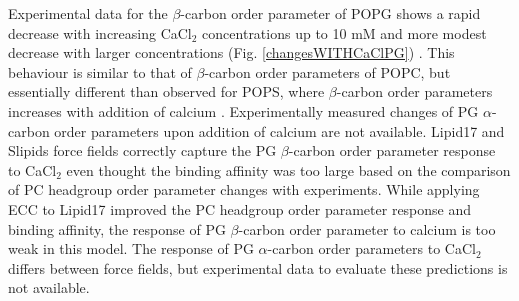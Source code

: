 \documentclass[aps,prl,superscriptaddress,twocolumn]{revtex4}
\begin{document}
Experimental data for the $\beta$-carbon order parameter of POPG
shows a rapid decrease with increasing CaCl$_2$ concentrations up to 10 mM
and more modest decrease with larger concentrations (Fig. \ref{changesWITHCaClPG}) \cite{borle85}.
This behaviour is similar to that of $\beta$-carbon order parameters of POPC,
but essentially different than observed for POPS, where $\beta$-carbon order parameters increases with
addition of calcium \cite{antila19}. Experimentally measured changes of PG $\alpha$-carbon order parameters upon addition of
calcium are not available.
Lipid17 and Slipids force fields correctly capture the PG $\beta$-carbon order parameter response to CaCl$_2$
even thought the binding affinity was too large based on the comparison of PC headgroup order parameter changes with experiments.
While applying ECC to Lipid17 improved the PC headgroup order parameter response and binding affinity,
the response of PG $\beta$-carbon order parameter to calcium is too weak in this model.
The response of PG $\alpha$-carbon order parameters to CaCl$_2$ differs between force fields,
but experimental data to evaluate these predictions is not available. 


\end{document}
